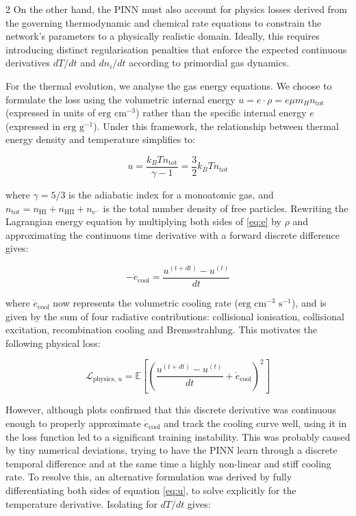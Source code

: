 \documentclass[10pt,a4paper]{article}
\begin{document}
\begin{multicols}{2}
On the other hand, the PINN must also account for physics losses derived from the governing thermodynamic and chemical rate equations to constrain the network's parameters to a physically realistic domain. Ideally, this requires introducing distinct regularisation penalties that enforce the expected continuous derivatives $dT/dt$ and $dn_i/dt$ according to primordial gas dynamics.

For the thermal evolution, we analyse the gas energy equations. We choose to formulate the loss using the volumetric internal energy $u = e\cdot\rho = e\mu m_H n_{\text{tot}}$ (expressed in units of $\text{erg cm}^{-3}$) rather than the specific internal energy $e$ (expressed in $\text{erg g}^{-1}$). Under this framework, the relationship between thermal energy density and temperature simplifies to:

\begin{equation}
u = \frac{k_B T n_{\text{tot}}}{\gamma - 1} = \frac{3}{2} k_B T n_{\text{tot}}
\label{eq:u}
\end{equation}

where $\gamma = 5/3$ is the adiabatic index for a monoatomic gas, and $n_{\text{tot}} = n_{\mathrm{HI}} + n_{\mathrm{HII}} + n_{\mathrm{e}^{-}}$ is the total number density of free particles. Rewriting the Lagrangian energy equation by multiplying both sides of \ref{eq:e} by $\rho$ and approximating the continuous time derivative with a forward discrete difference gives:

\[
-\dot{e}_{\text{cool}} = \frac{u^{(t+dt)} - u^{(t)}}{dt}
\]

where $\dot{e}_{\text{cool}}$ now represents the volumetric cooling rate ($\text{erg cm}^{-3}\text{ s}^{-1}$), and is given by the sum of four radiative contributions: collisional ionisation, collisional excitation, recombination cooling and Bremsstrahlung. This motivates the following physical loss:

\[
\mathcal{L}_{\text{physics, } u} = \mathbb{E}\left[\left(\frac{u^{(t+dt)} - u^{(t)}}{dt} + \dot{e}_{\text{cool}} \right)^2\right]
\]

However, although plots confirmed that this discrete derivative was continuous enough to properly approximate $\dot{e}_{\text{cool}}$ and track the cooling curve well, using it in the loss function led to a significant training instability. This was probably caused by tiny numerical deviations, trying to have the PINN learn through a discrete temporal difference and at the same time a highly non-linear and stiff cooling rate. To resolve this, an alternative formulation was derived by fully differentiating both sides of equation \ref{eq:u}, to solve explicitly for the temperature derivative. Isolating for $dT/dt$ gives:


\end{multicols}
\end{document}
